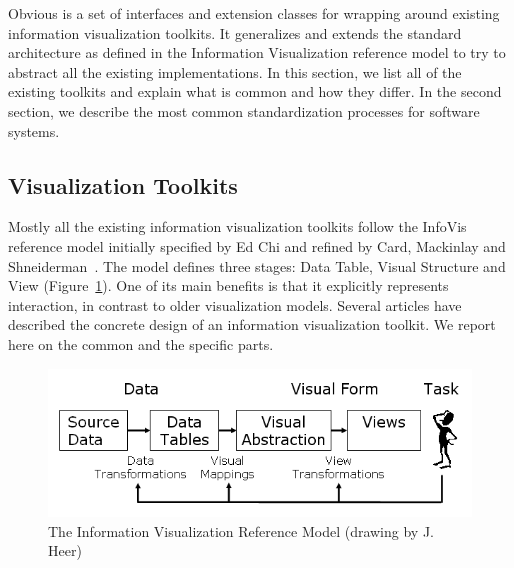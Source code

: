 Obvious is a set of interfaces and extension classes for wrapping
around existing information visualization toolkits.  It generalizes
and extends the standard architecture as defined in the Information
Visualization reference model to try to abstract all the existing
implementations.  In this section, we list all of the existing
toolkits and explain what is common and how they differ.  In the
second section, we describe the most common standardization processes
for software systems.

\subsection{Visualization Toolkits}

Mostly all the existing information visualization toolkits follow the
InfoVis reference model initially specified by Ed Chi and refined by
Card, Mackinlay and Shneiderman~\cite{ChiRefModel,ReadingsIV}.  The
model defines three stages: Data Table, Visual Structure and View
(Figure~\ref{fig:refmodel}).  One of its main benefits is that it
explicitly represents interaction, in contrast to older visualization models.
Several articles have described the concrete design of an information
visualization toolkit.  We report here on the common and the
specific parts.

\begin{figure}
\includegraphics[width=\columnwidth]{figures/reference_model}
\caption{The Information Visualization Reference Model (drawing by
  J. Heer)}
\label{fig:refmodel}
\end{figure}


